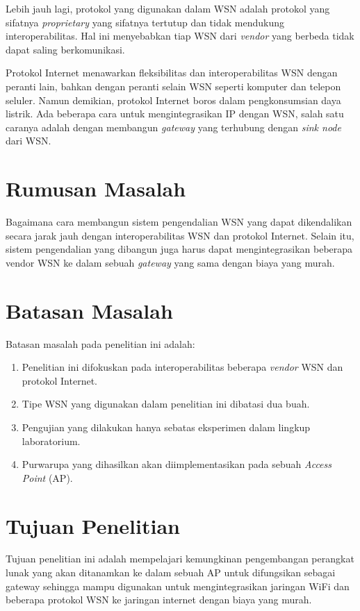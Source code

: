 Lebih jauh lagi, protokol yang digunakan dalam WSN adalah protokol yang sifatnya \emph{proprietary} yang sifatnya tertutup dan tidak mendukung interoperabilitas. Hal ini menyebabkan tiap WSN dari \emph{vendor} yang berbeda tidak dapat saling berkomunikasi.

Protokol Internet menawarkan fleksibilitas dan interoperabilitas WSN dengan peranti lain, bahkan dengan peranti selain WSN seperti komputer dan telepon seluler. Namun demikian, protokol Internet boros dalam pengkonsumsian daya listrik. Ada beberapa cara untuk mengintegrasikan IP dengan WSN, salah satu caranya adalah dengan membangun \emph{gateway} yang terhubung dengan \emph{sink node} dari WSN.


\section{Rumusan Masalah}
Bagaimana cara membangun sistem pengendalian WSN yang dapat dikendalikan secara jarak jauh dengan interoperabilitas WSN dan protokol Internet. Selain itu, sistem pengendalian yang dibangun juga harus dapat mengintegrasikan beberapa vendor WSN ke dalam sebuah \emph{gateway} yang sama dengan biaya yang murah.


\section{Batasan Masalah}
Batasan masalah pada penelitian ini adalah:
\begin{enumerate}
\item Penelitian ini difokuskan pada interoperabilitas beberapa \emph{vendor} WSN dan protokol Internet.
\item Tipe WSN yang digunakan dalam penelitian ini dibatasi dua buah.
\item Pengujian yang dilakukan hanya sebatas eksperimen dalam lingkup laboratorium.
\item Purwarupa yang dihasilkan akan diimplementasikan pada sebuah \emph{Access Point} (AP).
\end{enumerate}


\section{Tujuan Penelitian}
Tujuan penelitian ini adalah mempelajari kemungkinan pengembangan perangkat lunak yang akan ditanamkan ke dalam sebuah AP untuk difungsikan sebagai gateway sehingga mampu digunakan untuk mengintegrasikan jaringan WiFi dan beberapa protokol WSN ke jaringan internet dengan biaya yang murah.



